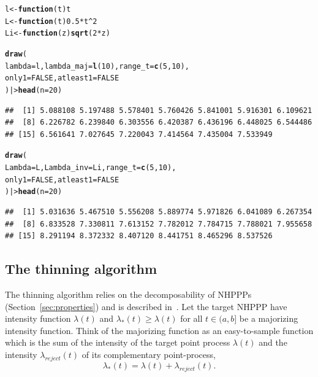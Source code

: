 \documentclass[article,nojss]{jss}\usepackage[]{graphicx}\usepackage[]{xcolor}
\makeatletter
\newcommand{\hlnum}[1]{\textcolor[rgb]{0.686,0.059,0.569}{#1}}%
\newcommand{\hlopt}[1]{\textcolor[rgb]{0,0,0}{#1}}%
\newcommand{\hlstd}[1]{\textcolor[rgb]{0.345,0.345,0.345}{#1}}%
\newcommand{\hlkwa}[1]{\textcolor[rgb]{0.161,0.373,0.58}{\textbf{#1}}}%
\newcommand{\hlkwb}[1]{\textcolor[rgb]{0.69,0.353,0.396}{#1}}%
\newcommand{\hlkwc}[1]{\textcolor[rgb]{0.333,0.667,0.333}{#1}}%
\newcommand{\hlkwd}[1]{\textcolor[rgb]{0.737,0.353,0.396}{\textbf{#1}}}%
\newenvironment{kframe}{%
 \def\at@end@of@kframe{}%
 \ifinner\ifhmode%
  \def\at@end@of@kframe{\end{minipage}}%
  \begin{minipage}{\columnwidth}%
 \fi\fi%
 \def\FrameCommand##1{\hskip\@totalleftmargin \hskip-\fboxsep
 \colorbox{shadecolor}{##1}\hskip-\fboxsep
     \hskip-\linewidth \hskip-\@totalleftmargin \hskip\columnwidth}%
 \MakeFramed {\advance\hsize-\width
   \@totalleftmargin\z@ \linewidth\hsize
   \@setminipage}}%
 {\par\unskip\endMakeFramed%
 \at@end@of@kframe}
\newenvironment{knitrout}{}{} %
\makeatother
\begin{document}
\begin{knitrout}
\color{fgcolor}\begin{kframe}
\begin{alltt}
\hlstd{l} \hlkwb{<-} \hlkwa{function}\hlstd{(}\hlkwc{t}\hlstd{) t}
\hlstd{L} \hlkwb{<-} \hlkwa{function}\hlstd{(}\hlkwc{t}\hlstd{)} \hlnum{0.5} \hlopt{*} \hlstd{t}\hlopt{^}\hlnum{2}
\hlstd{Li} \hlkwb{<-} \hlkwa{function}\hlstd{(}\hlkwc{z}\hlstd{)} \hlkwd{sqrt}\hlstd{(}\hlnum{2} \hlopt{*} \hlstd{z)}

\hlkwd{draw}\hlstd{(}
  \hlkwc{lambda} \hlstd{= l,} \hlkwc{lambda_maj} \hlstd{=} \hlkwd{l}\hlstd{(}\hlnum{10}\hlstd{),} \hlkwc{range_t} \hlstd{=} \hlkwd{c}\hlstd{(}\hlnum{5}\hlstd{,} \hlnum{10}\hlstd{),}
  \hlkwc{only1} \hlstd{=} \hlnum{FALSE}\hlstd{,} \hlkwc{atleast1} \hlstd{=} \hlnum{FALSE}
\hlstd{) |>} \hlkwd{head}\hlstd{(}\hlkwc{n} \hlstd{=} \hlnum{20}\hlstd{)}
\end{alltt}
\begin{verbatim}
##  [1] 5.088108 5.197488 5.578401 5.760426 5.841001 5.916301 6.109621
##  [8] 6.226782 6.239840 6.303556 6.420387 6.436196 6.448025 6.544486
## [15] 6.561641 7.027645 7.220043 7.414564 7.435004 7.533949
\end{verbatim}
\begin{alltt}
\hlkwd{draw}\hlstd{(}
  \hlkwc{Lambda} \hlstd{= L,} \hlkwc{Lambda_inv} \hlstd{= Li,} \hlkwc{range_t} \hlstd{=} \hlkwd{c}\hlstd{(}\hlnum{5}\hlstd{,} \hlnum{10}\hlstd{),}
  \hlkwc{only1} \hlstd{=} \hlnum{FALSE}\hlstd{,} \hlkwc{atleast1} \hlstd{=} \hlnum{FALSE}
\hlstd{) |>} \hlkwd{head}\hlstd{(}\hlkwc{n} \hlstd{=} \hlnum{20}\hlstd{)}
\end{alltt}
\begin{verbatim}
##  [1] 5.031636 5.467510 5.556208 5.889774 5.971826 6.041089 6.267354
##  [8] 6.833528 7.330811 7.613152 7.782012 7.784715 7.788021 7.955658
## [15] 8.291194 8.372332 8.407120 8.441751 8.465296 8.537526
\end{verbatim}
\end{kframe}
\end{knitrout}

\subsection{The thinning algorithm}\label{sec:thinning}
The thinning algorithm relies on the decomposability of NHPPPs (Section~\ref{sec:properties}) and is described in~\citet{lewis1979thinning}. Let the target NHPPP have intensity function $\lambda(t)$ and $\lambda_*(t) \ge \lambda(t)$ for all $t \in (a, b]$ be a majorizing intensity function. Think of the majorizing function as an easy-to-sample function which is the sum of the intensity of the target point process $\lambda(t)$ and the intensity $\lambda_{reject}(t)$ of its complementary point-process,
$$\lambda_*(t) = \lambda(t) + \lambda_{reject}(t).$$
\end{document}
